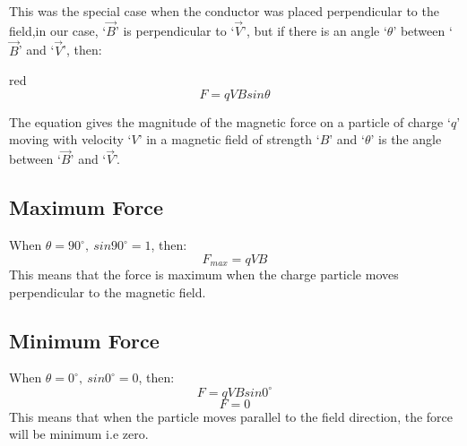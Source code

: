 This was the special case when the conductor was placed perpendicular to the field,in our case, ‘$\vec{B}$’ is perpendicular to ‘$\vec{V}$’, but if there is an angle `$\theta$' between ‘$\vec{B}$’ and ‘$\vec{V}$’, then:
\begin{mybox}{red}{}
 \begin{equation}\label{eq:13.20}
     F = qVBsin\theta
\end{equation}
\end{mybox}
The equation gives the magnitude of the magnetic force on a particle of charge ‘$q$’ moving with velocity ‘$V$’ in a magnetic field of strength ‘$B$’ and `$\theta$' is the angle between ‘$\vec{B}$’ and ‘$\vec{V}$’.
\subsection*{Maximum Force}
When $\theta = 90^\circ,\:sin90^{\circ} = 1$, then:
\begin{equation}\nonumber
     F_{max} = qVB
\end{equation}
This means that the force is maximum when the charge particle moves perpendicular to the magnetic field.
\subsection*{Minimum Force}
When $\theta = 0^{\circ},\:sin0^{\circ}=0$, then:
 \begin{equation}\nonumber
     F = qVBsin0^{\circ}
\end{equation}
\begin{equation}\nonumber
     F=0
\end{equation}
This means that when the particle moves parallel to the field direction, the force will be minimum i.e zero.
